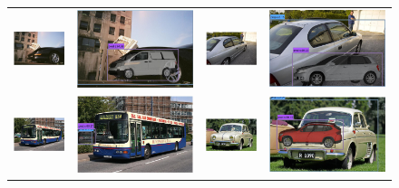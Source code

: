 \documentclass[10pt,twocolumn,letterpaper]{article}
\begin{document}
\begin{figure}[h]
\setlength\tabcolsep{1pt}
\centering
\begin{tabular}{|cc|cc|}
  \hline
  \includegraphics[width=0.22\linewidth]{supp/pas_car8a.png} &
  \includegraphics[width=0.22\linewidth]{supp/pas_car8b.png} & 
  \includegraphics[width=0.22\linewidth]{supp/pas_car9a.png} &
  \includegraphics[width=0.22\linewidth]{supp/pas_car9b.png} \\ 
  \includegraphics[width=0.22\linewidth]{supp/pas_car11a.png} &
  \includegraphics[width=0.22\linewidth]{supp/pas_car11b.png} & 
  \includegraphics[width=0.22\linewidth]{supp/pas_car12a.png} &
  \includegraphics[width=0.22\linewidth]{supp/pas_car12b.png} \\

\end{tabular}
\end{figure}
\end{document}
